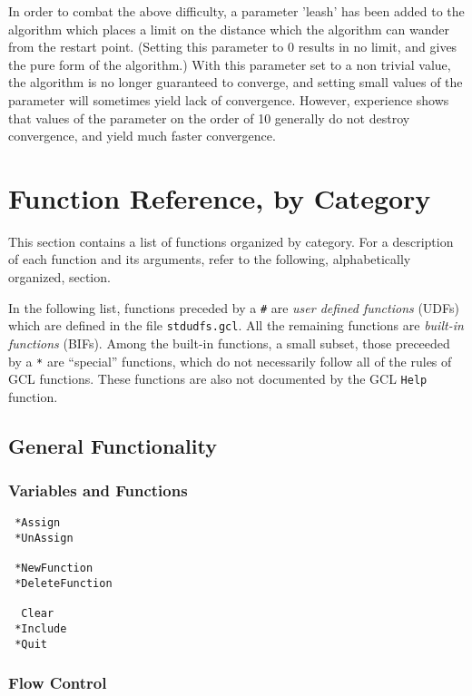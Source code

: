 In order to combat the above difficulty, a parameter 'leash' has been
added to the algorithm which places a limit on the distance which the
algorithm can wander from the restart point. (Setting this parameter
to 0 results in no limit, and gives the pure form of the algorithm.)
With this parameter set to a non trivial value, the algorithm is no
longer guaranteed to converge, and setting small values of the
parameter will sometimes yield lack of convergence.  However,
experience shows that values of the parameter on the order of 10
generally do not destroy convergence, and yield much faster
convergence.

\section{Function Reference, by Category}

This section contains a list of functions organized by
category.  For a description of each function and its arguments,
refer to the following, alphabetically organized, section.  

In the following list, functions preceded by a \verb+#+ are {\it user
defined functions} (UDFs) which are defined in the file
\verb+stdudfs.gcl+.  All the remaining functions are {\it built-in
functions} (BIFs).  Among the built-in functions, a small subset,
those preceeded by a \verb+*+ are ``special'' functions, which do not
necessarily follow all of the rules of GCL functions.  These functions
are also not documented by the GCL \verb+Help+ function.  

\subsection{General Functionality}

\subsubsection{Variables and Functions}

\begin{verbatim}
 *Assign 
 *UnAssign 

 *NewFunction
 *DeleteFunction

  Clear 
 *Include
 *Quit
\end{verbatim}

\subsubsection{Flow Control}

